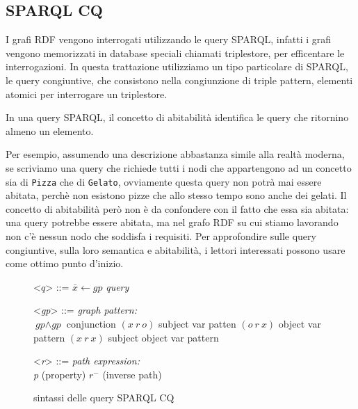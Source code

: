 
\subsection{SPARQL CQ} \label{sec:SPARQL}
\label{sec:SPARQLIntro}
I grafi RDF vengono interrogati utilizzando le query SPARQL, infatti i grafi vengono memorizzati in database speciali chiamati triplestore, per efficentare le interrogazioni. In questa trattazione utilizziamo un tipo particolare di SPARQL, le query congiuntive, che consistono nella congiunzione di triple pattern, elementi atomici per interrogare un triplestore.
\begin{definition}[Abitabilità]
	In una query SPARQL, il concetto di abitabilità identifica le query che ritornino almeno un elemento.
\end{definition}

\noindent Per esempio, assumendo una descrizione abbastanza simile alla realtà moderna, se scriviamo una query che richiede tutti i nodi che appartengono ad un concetto sia di \texttt{Pizza} che di \texttt{Gelato}, ovviamente questa query non potrà mai essere abitata, perchè non esistono pizze che allo stesso tempo sono anche dei gelati. Il concetto di abitabilità però non è da confondere con il fatto che essa sia abitata: una query potrebbe essere abitata, ma nel grafo RDF su cui stiamo lavorando non c'è nessun nodo che soddisfa i requisiti. Per approfondire sulle query congiuntive, sulla loro semantica e abitabilità, i lettori interessati possono usare \cite{baader2017introductionDL} come ottimo punto d'inizio.
\begin{figure}[h]
	\centering
	\begin{minipage}{0.5\textwidth}
		
		\setlength{\grammarindent}{6em} %
		\begin{grammar}
		\let\syntleft\relax
		\let\syntright\relax
		<$q$> ::= $\bar{x} \leftarrow \textit{gp}$ \hfill \textit{query}
		
		<\textit{gp}> ::= \hfill \textit{graph pattern:}\\
		$\textit{gp} \wedge \textit{gp}$ \hfill conjunction
		\alt $(x\ r\ o)$ \hfill subject var patten
		\alt $(o\ r\ x)$ \hfill object var pattern
		\alt $(x\ r\ x)$ \hfill subject object var pattern
		
		<\textit{r}> ::= \hfill \textit{path expression:}\\
		\textit{p} \hfill (property)
		\alt $r^-$ \hfill (inverse path)
		
	\end{grammar}
	\end{minipage}
    \caption{sintassi delle query SPARQL CQ}
    \label{fig:leinbergerSyntax}
\end{figure}
\newpage
